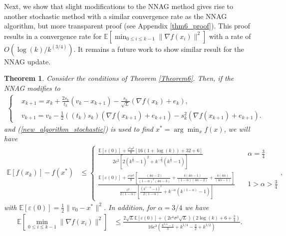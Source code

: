 \documentclass{article}
\theoremstyle{plain}
\newtheorem{theorem}{Theorem}[section]
\theoremstyle{definition}
\theoremstyle{remark}
\begin{document}
Next, we show that slight modifications to the NNAG method gives rise to another stochastic method with a similar convergence rate as the NNAG algorithm, but more transparent proof (see Appendix \ref{thm6_proof}). This proof results in a convergence rate for $\mathbb E\left[\min_{0\leq i\leq k-1}\|\nabla f(x_i)\|^2 \right]$ with a rate of $O(\log(k)/k^{(3/4)})$. It remains a future work to show similar result for the NNAG update.
\begin{theorem}\label{Theorem5}
   Consider the conditions of Theorem \ref{Theorem6}. Then, if the NNAG modifies to
   \begin{align}\label{new_algorithm_stochastic}
   \left\{ \begin{array}{ll}
    &x_{k+1}   =    x_{k} + \frac{2s_k}{t_k}(v_k-x_{k+1})-\frac{s_k}{\sqrt{L}}(\nabla f(x_k)+e_k),\\
     &v_{k+1}    = v_k -\tfrac{1}{2}((t_k)s_k)(\nabla f(x_{k+1})+e_{k+1})-s_k^2(\nabla f(x_{k+1})+e_{k+1}). 
    \end{array}\right.
\end{align}
and (\ref{new_algorithm_stochastic}) is used to find $x^*=\arg\min_x f(x)$, we will have
    \begin{align}\label{conv_rate1_them6}
    \mathbb E[f(x_k)]-f(x^*)&\leq \left\{\begin{array}{lr}
         \frac{\mathbb E[\varepsilon (0)]+\frac{c^4\sigma^2}{8}\left[16(1+\log(k))+32+6\right]}{2c^2\left[2(k^{\frac{1}{4}}-1)^2+k^{-\frac{3}{4}}(k^{\frac{1}{4}}-1)\right]} & \quad \alpha=\frac{3}{4} \\
          \frac{\mathbb E[\varepsilon (0)]+\frac{c^4\sigma^2}{8}\left[\frac{(4\alpha -2)}{(1-\alpha)^2(4\alpha-3)}+\frac{4(4\alpha -1)}{(1-\alpha)(4\alpha -2)}+\frac{4(4\alpha )}{(4\alpha -1)}\right]}{\frac{c^2}{2(1-\alpha)}\left[\frac{(k^{1-\alpha}-1)^2}{2(1-\alpha)}+k^{-\alpha}(k^{(1-\alpha)}-1)\right]}& \quad 1>\alpha>\frac{3}{4}
    \end{array}\right.,
\end{align}
with $\mathbb E[\varepsilon (0)]=\frac{1}{2}\|v_0-x^*\|^2$. In addition, for $\alpha = 3/4$ we have
\begin{align}\label{conv_rate2_them6}
    \mathbb E\left[\min_{0\leq i\leq k-1}\|\nabla f(x_i)\|^2 \right] &\leq \frac{2\sqrt{L}\mathbb E[\varepsilon (0)]+(2c^4\sigma^2\sqrt{L})(2\log (k)+6+\frac{3}{4})}{16c^3\left( \frac{k^{3/4}-1}{3} +k^{1/4}-\frac{3}{2}+k^{1/2}\right)}.
\end{align}
\end{theorem}
\end{document}
